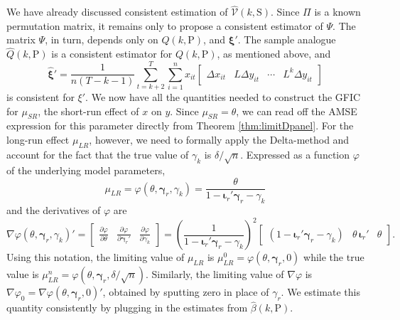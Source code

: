 We have already discussed consistent estimation of $\widehat{\mathcal{V}}(k,\text{S})$.
Since $\Pi$ is a known permutation matrix, it remains only to propose a consistent estimator of $\Psi$. 
The matrix $\Psi$, in turn, depends only on $Q(k,\text{P})$, and $\boldsymbol{\xi}'$.
The sample analogue $\widehat{Q}(k,\text{P})$ is a consistent estimator for $Q(k,\text{P})$, as mentioned above, and
\begin{equation}
  \widehat{\boldsymbol{\xi}}' = \frac{1}{n(T - k - 1)} \sum_{t = k+2}^T \sum_{i=1}^n x_{it}\left[
  \begin{array}{cccc}
    \Delta x_{it} & L \Delta y_{it} & \cdots & L^{k} \Delta y_{it} 
  \end{array}
\right]
\end{equation}
is consistent for $\xi'$.
We now have all the quantities needed to construct the GFIC for $\mu_{SR}$, the short-run effect of $x$ on $y$.
Since $\mu_{SR} = \theta$, we can read off the AMSE expression for this parameter directly from Theorem \ref{thm:limitDpanel}.
For the long-run effect $\mu_{LR}$, however, we need to formally apply the Delta-method and account for the fact that the true value of $\gamma_k$ is $\delta/\sqrt{n}$.
Expressed as a function $\varphi$ of the underlying model parameters, 
\[
  \mu_{LR} = \varphi(\theta, \boldsymbol{\gamma}_r, \gamma_k) = \frac{\theta}{1 - \boldsymbol{\iota}_r' \boldsymbol{\gamma}_r - \gamma_k}
\]
and the derivatives of $\varphi$ are
\[
  \nabla \varphi(\theta, \boldsymbol{\gamma}_r, \gamma_k)' = \left[
  \begin{array}{ccc}
    \displaystyle\frac{\partial \varphi}{\partial \theta} & 
    \displaystyle\frac{\partial \varphi}{\partial \boldsymbol{\gamma}_r'} &
    \displaystyle\frac{\partial \varphi}{\partial \gamma_k} 
  \end{array}
\right] = 
\left( \frac{1}{1 - \boldsymbol{\iota}_r' \boldsymbol{\gamma}_r - \gamma_k} \right)^2 \left[
\begin{array}{ccc}
  \left( 1 - \boldsymbol{\iota}_r' \boldsymbol{\gamma}_r - \gamma_k \right) & \theta \,\boldsymbol{\iota}_r' & \theta 
\end{array}
\right].
\]
Using this notation, the limiting value of $\mu_{LR}$ is $\mu_{LR}^{0} =  \varphi(\theta, \boldsymbol{\gamma}_r, 0)$
while the true value is
$\mu_{LR}^{n} = \varphi(\theta, \boldsymbol{\gamma}_r, \delta/\sqrt{n})$.
Similarly, the limiting value of $\nabla\varphi$ is $\nabla \varphi_0 = \nabla \varphi(\theta, \boldsymbol{\gamma}_r, 0)'$, obtained by sputting zero in place of $\gamma_r$. 
We estimate this quantity consistently by plugging in the estimates from $\widehat{\beta}(k, \text{P})$.

